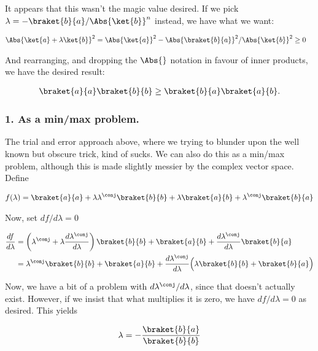 It appears that this wasn't the magic value desired.  If we pick $\lambda = -\braket{b}{a}/\Abs{\ket{b}}^n$ instead, we have what we want:

\begin{align*}
\Abs{\ket{a} + \lambda \ket{b}}^2 
&= \Abs{\ket{a}}^2 - \Abs{\braket{b}{a}}^2/\Abs{\ket{b}}^2 \ge 0
\end{align*}

And rearranging, and dropping the $\Abs{}$ notation in favour of inner products, we have the desired result:

\begin{align*}
\braket{a}{a} \braket{b}{b} \ge \braket{b}{a}\braket{a}{b}.
\end{align*}

\subsubsection{1. As a min/max problem.}

The trial and error approach above, where we trying to blunder upon the well known but obscure trick, kind of sucks.  We can also do this as a min/max problem, although this is made slightly messier by the complex vector space.  Define

\begin{align*}
f(\lambda) =
\braket{a}{a} + \lambda \lambda^\conj \braket{b}{b} + \lambda \braket{a}{b} + \lambda^\conj \braket{b}{a} \\
\end{align*}

Now, set $df/d\lambda = 0$

\begin{align*}
\frac{df}{d\lambda} 
&=
\left(\lambda^\conj + \lambda \frac{d\lambda^\conj}{d\lambda}\right) \braket{b}{b} + \braket{a}{b} + \frac{d\lambda^\conj}{d\lambda} \braket{b}{a} \\
&=
\lambda^\conj \braket{b}{b} + \braket{a}{b} 
+
\frac{d\lambda^\conj}{d\lambda} \Bigl( 
\lambda \braket{b}{b} + \braket{b}{a} \Bigr)
\end{align*}

Now, we have a bit of a problem with $d\lambda^\conj/d\lambda$, since that doesn't actually exist.  However, if we insist that what multiplies it is zero, we have $df/d\lambda = 0$ as desired.  This yields 

\begin{align*}
\lambda = - \frac{\braket{b}{a} }{ \braket{b}{b}  }
\end{align*}

